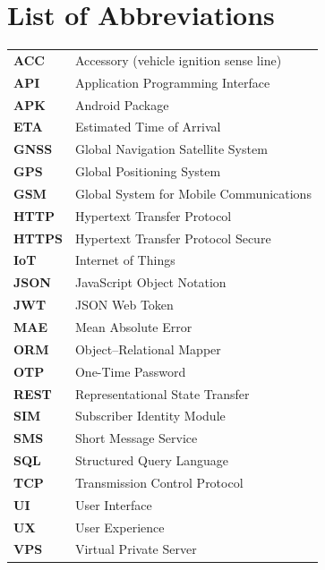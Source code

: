 \chapter*{List of Abbreviations}
\thispagestyle{plain}

\begin{longtable}{@{}p{2.6cm}p{11.5cm}@{}}
\textbf{ACC}   & Accessory (vehicle ignition sense line) \\
\textbf{API}   & Application Programming Interface \\
\textbf{APK}   & Android Package \\
\textbf{ETA}   & Estimated Time of Arrival \\
\textbf{GNSS}  & Global Navigation Satellite System \\
\textbf{GPS}   & Global Positioning System \\
\textbf{GSM}   & Global System for Mobile Communications \\
\textbf{HTTP}  & Hypertext Transfer Protocol \\
\textbf{HTTPS} & Hypertext Transfer Protocol Secure \\
\textbf{IoT}   & Internet of Things \\
\textbf{JSON}  & JavaScript Object Notation \\
\textbf{JWT}   & JSON Web Token \\
\textbf{MAE}   & Mean Absolute Error \\
\textbf{ORM}   & Object--Relational Mapper \\
\textbf{OTP}   & One-Time Password \\
\textbf{REST}  & Representational State Transfer \\
\textbf{SIM}   & Subscriber Identity Module \\
\textbf{SMS}   & Short Message Service \\
\textbf{SQL}   & Structured Query Language \\
\textbf{TCP}   & Transmission Control Protocol \\
\textbf{UI}    & User Interface \\
\textbf{UX}    & User Experience \\
\textbf{VPS}   & Virtual Private Server \\
\end{longtable}
